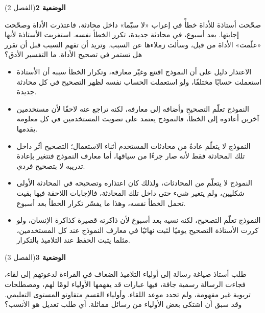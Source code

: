 \documentclass[11pt,a4paper]{article}
\begin{document}
\par\vspace{6pt}
\noindent
{\large\khatt\textbf{الوضعية 2}}\hfill{\small(الفصل 2)}\par\nopagebreak\vspace{3pt}
\setlength{\fboxsep}{7pt}\colorbox{gray!10}{\parbox{\dimexpr\linewidth-14pt}{صحّحت أستاذة للأداة خطأً في إعراب «لا سيّما» داخل محادثة، فاعتذرت الأداة وصحّحت إجابتها. بعد أسبوع، في محادثة جديدة، تكرر الخطأ نفسه. استغربت الأستاذة لأنها «علّمت» الأداة من قبل، وسألت زملاءها عن السبب. وتريد أن تفهم السبب قبل أن تقرر هل تستمر في تصحيح الأداة. ما التفسير الأدق؟}}\par\nopagebreak
\begin{itemize}[leftmargin=1.0cm, labelsep=6pt, itemsep=3pt, topsep=4pt, parsep=0pt]
  \item[\textbf{أ)}] الاعتذار دليل على أن النموذج اقتنع وغيّر معارفه، وتكرار الخطأ سببه أن الأستاذة استعملت حسابًا مختلفًا، ولو استعملت الحساب نفسه لظهر التصحيح في كل محادثة جديدة.
  \item[\textbf{ب)}] النموذج تعلّم التصحيح وأضافه إلى معارفه، لكنه تراجع عنه لاحقًا لأن مستخدمين آخرين أعادوه إلى الخطأ، فالنموذج يعتمد على تصويت المستخدمين في كل معلومة يقدمها.
  \item[\textbf{ج)}] النموذج لا يتعلّم عادةً من محادثات المستخدم أثناء الاستعمال؛ التصحيح أثّر داخل تلك المحادثة فقط لأنه صار جزءًا من سياقها، أما معارف النموذج فتتغير بإعادة تدريبه لا بتصحيح فردي.
  \item[\textbf{د)}] النموذج لا يتعلّم من المحادثات، ولذلك كان اعتذاره وتصحيحه في المحادثة الأولى شكليين، ولم يتغير شيء حتى داخل تلك المحادثة، فالإجابات اللاحقة فيها بقيت تحمل الخطأ نفسه، وهذا ما يفسّر تكرار الخطأ بعد أسبوع.
  \item[\textbf{هـ)}] النموذج تعلّم التصحيح، لكنه نسيه بعد أسبوع لأن ذاكرته قصيرة كذاكرة الإنسان، ولو كررت الأستاذة التصحيح يوميًا لثبت نهائيًا في معارف النموذج عند كل المستخدمين، مثلما يثبت الحفظ عند التلاميذ بالتكرار.
\end{itemize}
\par\vspace{6pt}
\noindent
{\large\khatt\textbf{الوضعية 3}}\hfill{\small(الفصل 3)}\par\nopagebreak\vspace{3pt}
\setlength{\fboxsep}{7pt}\colorbox{gray!10}{\parbox{\dimexpr\linewidth-14pt}{طلب أستاذ صياغة رسالة إلى أولياء التلاميذ الضعاف في القراءة لدعوتهم إلى لقاء، فجاءت الرسالة رسمية جافة، فيها عبارات قد يفهمها الأولياء لومًا لهم، ومصطلحات تربوية غير مفهومة، ولم تحدد موعد اللقاء. وأولياء القسم متفاوتو المستوى التعليمي. وقد سبق أن اشتكى بعض الأولياء من رسائل مماثلة. أي طلب تعديل هو الأنسب؟}}\par\nopagebreak
\end{document}
